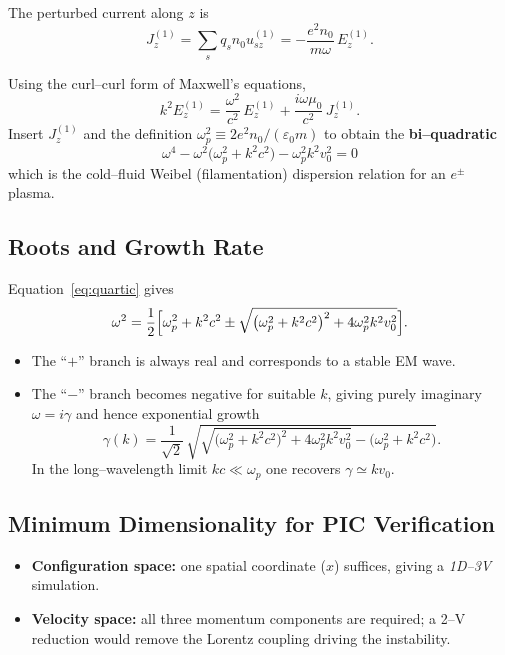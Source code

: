 The perturbed current along $z$ is
\[
J^{(1)}_z = \sum_s q_s n_0 u^{(1)}_{sz}
          = -\frac{e^{2} n_0}{m\omega}\,E^{(1)}_z .
\]

Using the curl--curl form of Maxwell's equations,
\[
k^{2} E^{(1)}_z = \frac{\omega^{2}}{c^{2}}\,E^{(1)}_z + \frac{i\omega\mu_{0}}{c^{2}}\,J^{(1)}_z .
\]
Insert $J^{(1)}_z$ and the definition $\omega_{p}^{2}\equiv 2e^{2}n_0/(\varepsilon_0 m)$ to obtain the \textbf{bi--quadratic}
\begin{equation}
\boxed{\;
\omega^{4} - \omega^{2}\!\bigl(\omega_{p}^{2}+k^{2}c^{2}\bigr)
          - \omega_{p}^{2}k^{2}v_{0}^{2}=0
\;}
\label{eq:quartic}
\end{equation}
which is the cold--fluid Weibel (filamentation) dispersion relation for an $e^\pm$ plasma.

\subsection{Roots and Growth Rate}

Equation~\ref{eq:quartic} gives
\begin{equation}
\omega^{2} = \frac{1}{2}\Bigl[\omega_{p}^{2}+k^{2}c^{2}
      \pm \sqrt{\bigl(\omega_{p}^{2}+k^{2}c^{2}\bigr)^{2}
      +4\omega_{p}^{2}k^{2}v_{0}^{2}}
      \Bigr].
\label{eq:roots}
\end{equation}

\begin{itemize}
  \item The ``$+$'' branch is always real and corresponds to a stable EM wave.
  \item The ``$-$'' branch becomes negative for suitable $k$, giving purely imaginary $\omega=i\gamma$ and hence exponential growth
  \[
  \gamma(k)=\frac{1}{\sqrt{2}}\,
  \sqrt{\sqrt{\bigl(\omega_{p}^{2}+k^{2}c^{2}\bigr)^{2}+4\omega_{p}^{2}k^{2}v_{0}^{2}}
  -\bigl(\omega_{p}^{2}+k^{2}c^{2}\bigr)}.
  \]
  In the long--wavelength limit $kc\ll\omega_{p}$ one recovers $\gamma\simeq k v_{0}$.
\end{itemize}

\subsection{Minimum Dimensionality for PIC Verification}

\begin{itemize}
  \item \textbf{Configuration space:} one spatial coordinate ($x$) suffices, giving a \emph{1D--3V} simulation.
  \item \textbf{Velocity space:} all three momentum components are required; a 2--V reduction would remove the Lorentz coupling driving the instability.
\end{itemize}

